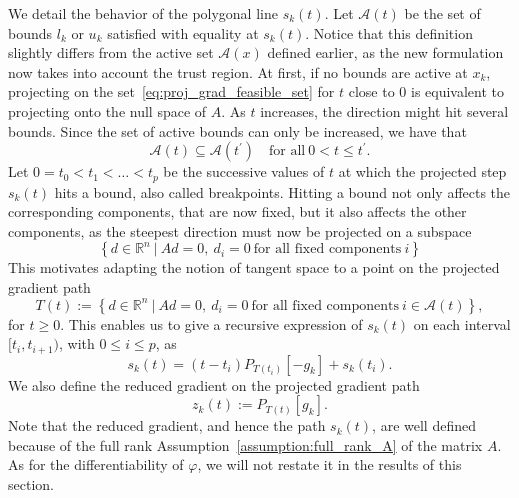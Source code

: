 \documentclass{article}
\numberwithin{equation}{section}
\newcommand{\RR}{{\mathbb{R}}} %
\newcommand{\calA}{{\mathcal{A}}}
\newcommand{\proj}[2]{P_{#1} \left[ {#2} \right]} %
\theoremstyle{plain}
\begin{document}
	We detail the behavior of the polygonal line $s_k(t)$. Let $\calA(t)$ be the set of bounds $l_k$ or $u_k$ satisfied with equality at $s_k(t)$. Notice that this definition slightly differs from the active set $\calA(x)$ defined earlier, as the new formulation now takes into account the trust region. At first, if no bounds are active at $x_k$, projecting on the set~\eqref{eq:proj_grad_feasible_set} for $t$ close to $0$ is equivalent to projecting onto the null space of $A$. As $t$ increases, the direction might hit several bounds. Since the set of active bounds can only be increased, we have that
	\begin{equation}\label{eq:nested_active_sets}
		\calA(t) \subseteq \calA(t^\prime) \quad \text{for all}\ 0 < t \le t^\prime.
	\end{equation}
	Let \(0=t_0 < t_1 < \ldots < t_p\) be the successive values of $t$ at which the projected step $s_k(t)$ hits a bound, also called breakpoints. Hitting a bound not only affects the corresponding components, that are now fixed, but it also affects the other components, as the steepest direction must now be projected on a subspace
	\[\left\{d \in \RR^n \ | \ Ad=0,\ d_i=0\ \text{for all fixed components}\ i\right\}\]
	This motivates adapting the notion of tangent space to a point on the projected gradient path
	\begin{equation*}
		T(t) := \left\{ d \in \RR^n \ | \ Ad = 0,\ d_i=0\ \text{for all fixed components}\ i\in \calA(t)\right\},
	\end{equation*}
	for $t\ge0$. This enables us to give a recursive expression of $s_k(t)$ on each interval $[t_i,t_{i+1})$, with $0 \leq i \le p$, as
	\begin{equation}\label{eq:projected_gradient_path_recursion}
		s_k(t) = (t-t_i) \proj{T(t_i)}{-g_k} + s_k(t_i).
	\end{equation}
	We also define the reduced gradient on the projected gradient path
	\begin{equation}\label{eq:reduced_gradient_proj_grad_path}
		z_k(t) := \proj{T(t)}{g_k}.
	\end{equation}
	Note that the reduced gradient, and hence the path $s_k(t)$, are well defined because of the full rank Assumption~\ref{assumption:full_rank_A} of the matrix $A$. As for the differentiability of $\varphi$, we will not restate it in the results of this section.
	
\end{document}
